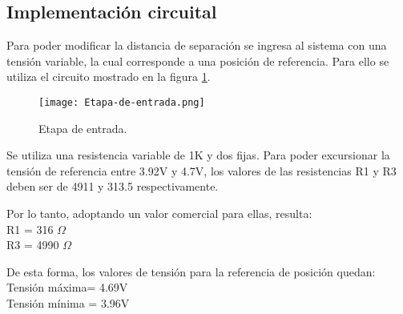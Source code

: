 \subsection{Implementación circuital}

\noindent Para poder modificar la distancia de separación se ingresa al sistema con una tensión variable, la cual corresponde a una posición de referencia. Para ello se utiliza el circuito mostrado en la figura \ref{fig:etapa-de-entrada}.

\begin{figure}[H]
	\centering
	\texttt{[image: Etapa-de-entrada.png]}
	\caption{ Etapa de entrada.}
	\label{fig:etapa-de-entrada}
\end{figure}

 
 \noindent Se utiliza una resistencia variable de 1K y dos fijas. Para poder excursionar la tensión de referencia entre 3.92V y 4.7V, los valores de las resistencias R1 y R3 deben ser de 4911 y 313.5 respectivamente. 
 
\noindent Por lo tanto, adoptando un valor comercial para ellas, resulta:\\
\noindent R1 = 316 $\Omega$\\
\noindent R3 = 4990 $\Omega$
 
\noindent De esta forma, los valores de tensión para la referencia de posición quedan:\\
\noindent Tensión máxima= 4.69V\\
\noindent Tensión mínima = 3.96V
 
